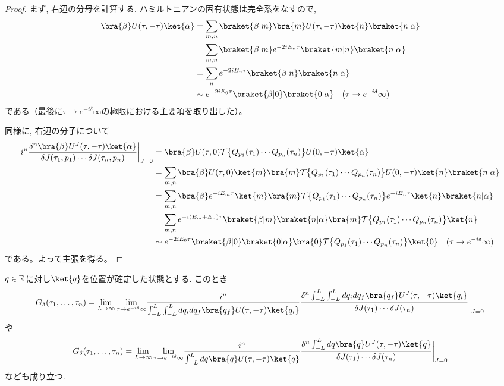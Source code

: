 \begin{proof}
まず, 右辺の分母を計算する.
ハミルトニアンの固有状態は完全系をなすので,
\begin{align*}
  \bra{\beta}U(\tau,-\tau)\ket{\alpha} &=
  \sum_{m,n}\braket{\beta| m}\bra{m}U(\tau,-\tau)\ket{n}\braket{n|\alpha} \\ &=
  \sum_{m,n}\braket{\beta| m}e^{-2iE_n\tau}\braket{m|n}\braket{n|\alpha} \\ &=
  \sum_n e^{-2iE_n\tau} \braket{\beta|n}\braket{n|\alpha} \\ &\sim
  e^{-2iE_0\tau} \braket{\beta|0}\braket{0|\alpha} \quad (\tau\to e^{-i\delta}\infty)
\end{align*}
である（最後に$\tau\to e^{-i\delta}\infty$の極限における主要項を取り出した）。

同様に, 右辺の分子について
\begin{align*}
  i^n\frac{\delta^n \bra{\beta}U^J(\tau, -\tau)\ket{\alpha}}{\delta J(\tau_1,p_1) \cdots \delta J(\tau_n,p_n)}
  \biggr|_{J=0} &=
  \bra{\beta} U(\tau, 0) \calT \bigl\{ Q_{p_1}(\tau_1)\cdots Q_{p_n}(\tau_n) \bigr\} U(0, -\tau)\ket{\alpha} \\ &=
  \sum_{m,n}\bra{\beta}U(\tau, 0)\ket{m}\bra{m}\calT\bigl\{ Q_{p_1}(\tau_1)\cdots Q_{p_n}(\tau_n)\bigr\}U(0, -\tau)\ket{n}\braket{n|\alpha} \\ &=
  \sum_{m,n}\bra{\beta}e^{-iE_m\tau}\ket{m}\bra{m}\calT\bigl\{ Q_{p_1}(\tau_1)\cdots Q_{p_n}(\tau_n)\bigr\}e^{-iE_n\tau}\ket{n}\braket{n|\alpha} \\ &=
  \sum_{m,n}e^{-i(E_m+E_n)\tau}\braket{\beta|m}\braket{n|\alpha}\bra{m}\calT\bigl\{ Q_{p_1}(\tau_1)\cdots Q_{p_n}(\tau_n)\bigr\}\ket{n} \\ &\sim
  e^{-2iE_0\tau}\braket{\beta|0}\braket{0|\alpha}
  \bra{0}\calT\bigl\{ Q_{p_1}(\tau_1)\cdots Q_{p_n}(\tau_n)\bigr\}\ket{0} \quad (\tau\to e^{-i\delta}\infty)
\end{align*}
である。よって主張を得る。
\end{proof}

\begin{thm}
  $q \in \mathbb{R}$に対し$\ket{q}$を位置が確定した状態とする.
  このとき
  \begin{equation}
    G_\delta(\tau_1,\ldots,\tau_n) =
    \lim_{L\to\infty}\lim_{\tau\to e^{-i\delta}\infty}
    \biggl.
    \frac{i^n}{\int_{-L}^L\int_{-L}^L dq_idq_f\bra{q_f}U(\tau,-\tau)\ket{q_i}}
    \frac{\delta^n \int_{-L}^{L}\int_{-L}^{L} dq_idq_f\bra{q_f}U^J(\tau, -\tau)\ket{q_i}}{\delta J(\tau_1) \cdots \delta J(\tau_n)}
    \biggr|_{J=0}
  \end{equation}
  や
  \begin{equation}
    G_\delta(\tau_1,\ldots,\tau_n) =
    \lim_{L\to\infty}\lim_{\tau\to e^{-i\delta}\infty}
    \biggl.
    \frac{i^n}{\int_{-L}^{L} dq\bra{q}U(\tau,-\tau)\ket{q}}
    \frac{\delta^n \int_{-L}^{L} dq\bra{q}U^J(\tau, -\tau)\ket{q}}{\delta J(\tau_1) \cdots \delta J(\tau_n)}
    \biggr|_{J=0}
  \end{equation}
  なども成り立つ.
\end{thm}

